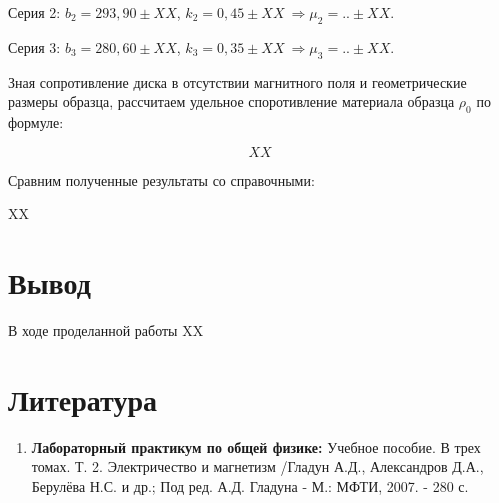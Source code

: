 \documentclass[a4paper, 12pt]{article}%
\begin{document}
Серия 2: $b_2 = 293,90 \pm XX$, $k_2 = 0,45 \pm XX\ \Rightarrow \mu_2 = .. \pm XX$.

Серия 3: $b_3 = 280,60 \pm XX$, $k_3 = 0,35 \pm XX\ \Rightarrow \mu_3 = .. \pm XX$.

Зная сопротивление диска в отсутствии магнитного поля и геометрические размеры образца, рассчитаем удельное споротивление материала образца $\rho_0$ по формуле:

\[ XX \]

Сравним полученные результаты со справочными:

XX

\section{Вывод}

В ходе проделанной работы XX

\section{Литература}

\begin{enumerate}
\item \textbf{Лабораторный практикум по общей физике:} Учебное пособие. В трех томах. Т. 2. Электричество и магнетизм /Гладун А.Д., Александров Д.А., Берулёва Н.С. и др.; Под ред. А.Д. Гладуна - М.: МФТИ, 2007. - 280 с.

\end{enumerate}		
		
\end{document}
